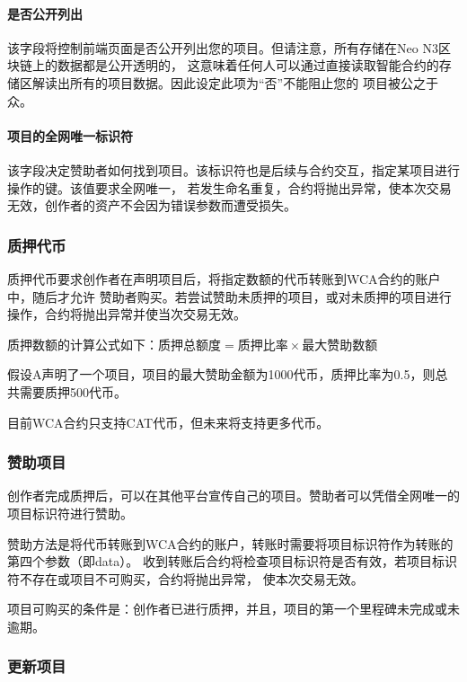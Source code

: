 \documentclass[11pt,UTF8,a4paper]{ctexart}
\begin{document}
    \paragraph{是否公开列出}

    该字段将控制前端页面是否公开列出您的项目。但请注意，所有存储在Neo N3区块链上的数据都是公开透明的，
    这意味着任何人可以通过直接读取智能合约的存储区解读出所有的项目数据。因此设定此项为“否”不能阻止您的
    项目被公之于众。

    \paragraph{项目的全网唯一标识符}

    该字段决定赞助者如何找到项目。该标识符也是后续与合约交互，指定某项目进行操作的键。该值要求全网唯一，
    若发生命名重复，合约将抛出异常，使本次交易无效，创作者的资产不会因为错误参数而遭受损失。

    \subsubsection{质押代币}

    质押代币要求创作者在声明项目后，将指定数额的代币转账到WCA合约的账户中，随后才允许
    赞助者购买。若尝试赞助未质押的项目，或对未质押的项目进行操作，合约将抛出异常并使当次交易无效。

    质押数额的计算公式如下：$\text{质押总额度} = \text{质押比率} \times \text{最大赞助数额}$

    假设A声明了一个项目，项目的最大赞助金额为1000代币，质押比率为0.5，则总共需要质押500代币。

    目前WCA合约只支持CAT代币，但未来将支持更多代币。

    \subsubsection{赞助项目}

    创作者完成质押后，可以在其他平台宣传自己的项目。赞助者可以凭借全网唯一的项目标识符进行赞助。

    赞助方法是将代币转账到WCA合约的账户，转账时需要将项目标识符作为转账的第四个参数（即data）。
    收到转账后合约将检查项目标识符是否有效，若项目标识符不存在或项目不可购买，合约将抛出异常，
    使本次交易无效。

    项目可购买的条件是：创作者已进行质押，并且，项目的第一个里程碑未完成或未逾期。

    \subsubsection{更新项目}
\end{document}
